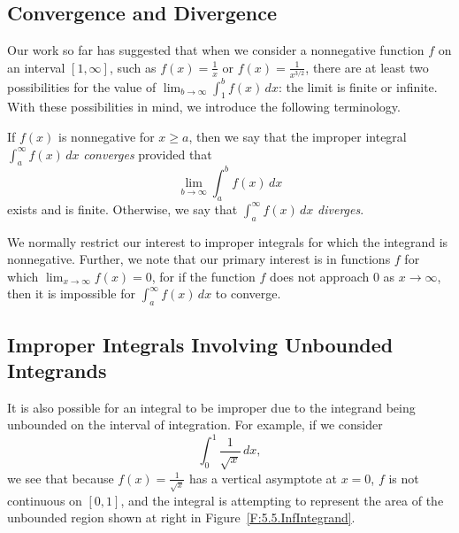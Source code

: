 

\subsection*{Convergence and Divergence} 

Our work so far has suggested that when we consider a nonnegative function $f$ on an interval $[1,\infty]$, such as $f(x) = \frac{1}{x}$ or $f(x) = \frac{1}{x^{3/2}}$, there are at least two possibilities for the value of $\lim_{b \to \infty} \int_1^b f(x) \, dx$:  the limit is finite or infinite.  With these possibilities in mind, we introduce the following terminology.

{If $f(x)$ is nonnegative for $x \ge a$, then we say that the improper integral $\int_a^{\infty} f(x) \, dx$
\emph{converges} provided that 
$$\lim_{b \to \infty} \int_a^{b} f(x) \, dx$$
exists and is finite.  Otherwise, we say that $\int_a^{\infty} f(x) \, dx$ \emph{diverges}.
} %

We normally restrict our interest to improper integrals for which the integrand is nonnegative.  Further, we note that our primary interest is in functions $f$ for which $\lim_{x \to \infty} f(x) = 0$, for if the function $f$ does not approach $0$ as $x \to \infty$, then it is impossible for $\int_a^{\infty} f(x) \, dx$ to converge.



\subsection*{Improper Integrals Involving Unbounded Integrands}

It is also possible for an integral to be improper due to the integrand being unbounded on the interval of integration.  For example, if we consider 
$$\int_0^1 \frac{1}{\sqrt{x}} \, dx,$$
we see that because $f(x) = \frac{1}{\sqrt{x}}$ has a vertical asymptote at $x = 0$, $f$ is not continuous on $[0,1]$, and the integral is attempting to represent the area of the unbounded region shown at right in Figure~\ref{F:5.5.InfIntegrand}.

